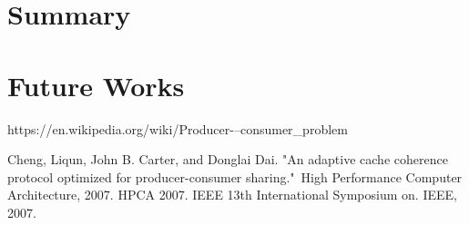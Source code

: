 \documentclass[conference]{IEEEtran}
\begin{document}
\section{Summary}


\section{Future Works}


\newpage

\begin{thebibliography}{1}

https://en.wikipedia.org/wiki/Producer-–consumer\_problem

Cheng, Liqun, John B. Carter, and Donglai Dai. "An adaptive cache coherence protocol optimized for producer-consumer sharing." High Performance Computer Architecture, 2007. HPCA 2007. IEEE 13th International Symposium on. IEEE, 2007.

\end{thebibliography}
\end{document}
